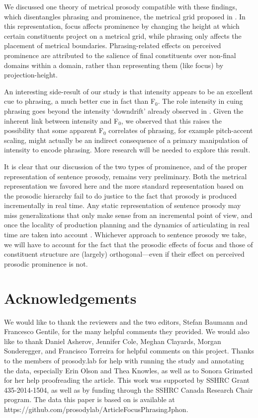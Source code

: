 \documentclass[preprint,review,12pt,authoryear,times]{elsarticle}
\begin{document}
We discussed one theory of metrical prosody compatible with these findings, which disentangles phrasing and prominence, the metrical grid proposed in \citet{wagner05recursion}. In this representation, focus affects prominence by changing the height at which certain constituents project on a metrical grid, while phrasing only affects the placement of metrical boundaries. Phrasing-related effects on perceived prominence are attributed to the salience of final constituents over non-final domains within a domain, rather than representing them (like focus) by projection-height. 

An interesting side-result of our study is that intensity appears to be an excellent cue to phrasing, a much better cue in fact than F$_0$. The role intensity in cuing phrasing goes beyond the intensity `downdrift' already observed in \citet{pierr79}. Given the inherent link between intensity and F$_0$, we observed that this raises the possibility that some apparent F$_0$ correlates of phrasing, for example pitch-accent scaling, might actually be an indirect consequence of a primary manipulation of intensity to encode phrasing. More research will be needed to explore this result.

It is clear that our discussion of the two types of prominence, and of the proper representation of sentence prosody, remains very preliminary. Both the metrical representation we favored here and the more standard representation based on the prosodic hierarchy fail to do justice to the fact that prosody is produced incrementally in real time. Any static representation of sentence prosody may miss generalizations that only make sense from an incremental point of view, and once the locality of production planning \citep[cf.][]{keati02} and the dynamics of articulating in real time are taken into account \citep[cf.][]{mucke14}. Whichever approach to sentence prosody we take, we will have to account for the fact that the prosodic effects of focus and those of constituent structure are (largely) orthogonal---even if their effect on perceived prosodic prominence is not.


\section*{Acknowledgements}

We would like to thank the reviewers and the two editors, Stefan Baumann and Francesco Gentile, for the many helpful comments they provided. We  would also like to thank Daniel Asherov, Jennifer Cole, Meghan Clayards, Morgan Sonderegger, and Francisco Torreira for helpful comments on this project. Thanks to the members of prosody.lab for help with running the study and annotating the data, especially Erin Olson and Thea Knowles, as well as to Sonora Grimsted for her help proofreading the article. This work was supported by SSHRC Grant 435-2014-1504, as well as by funding through the SSHRC Canada Research Chair program. The data this paper is based on is available at https://github.com/prosodylab/ArticleFocusPhrasingJphon.


\newpage


\end{document}
